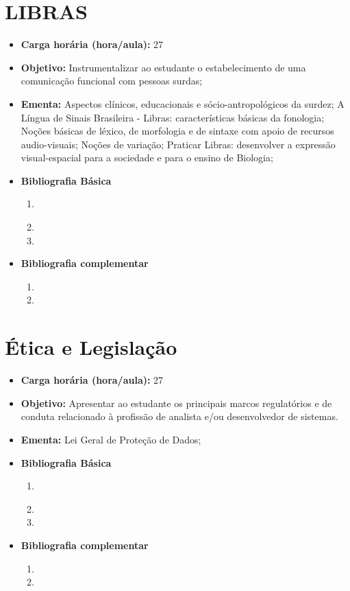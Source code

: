 \documentclass[11pt,fleqn]{book} %
\begin{document}
\section{LIBRAS}\label{5_libras}
\begin{itemize}
	\item \textbf{Carga horária (hora/aula):} 27
	\item \textbf{Objetivo:} Instrumentalizar ao estudante o estabelecimento de uma comunicação funcional com pessoas surdas;
	\item \textbf{Ementa:} 
	Aspectos clínicos, educacionais e sócio-antropológicos da surdez; 
	A Língua de Sinais Brasileira -	Libras: características básicas da fonologia;
	Noções básicas de léxico, de morfologia e de sintaxe com apoio de recursos audio-visuais; 
	Noções de variação; 
	Praticar Libras: desenvolver a expressão visual-espacial para a sociedade e para o ensino de Biologia;
	\item \textbf{Bibliografia Básica}
	\begin{enumerate}
		\item \cite{cartilha2012}
		\item 
		\item 
	\end{enumerate}
	\item \textbf{Bibliografia complementar}
	\begin{enumerate}
		\item 
		\item
	\end{enumerate} 	
\end{itemize}


\newpage
\section{Ética e Legislação}\label{5_etica}
\begin{itemize}
	\item \textbf{Carga horária (hora/aula):} 27
	\item \textbf{Objetivo:} Apresentar ao estudante os principais marcos regulatórios e de conduta relacionado à profissão de analista e/ou desenvolvedor de sistemas.
	\item \textbf{Ementa:} 
	Lei Geral de Proteção de Dados;
	\item \textbf{Bibliografia Básica}
	\begin{enumerate}
		\item \cite{cartilha2012}
		\item 
		\item 
	\end{enumerate}
	\item \textbf{Bibliografia complementar}
	\begin{enumerate}
		\item 
		\item
	\end{enumerate} 	
\end{itemize}
\end{document}

